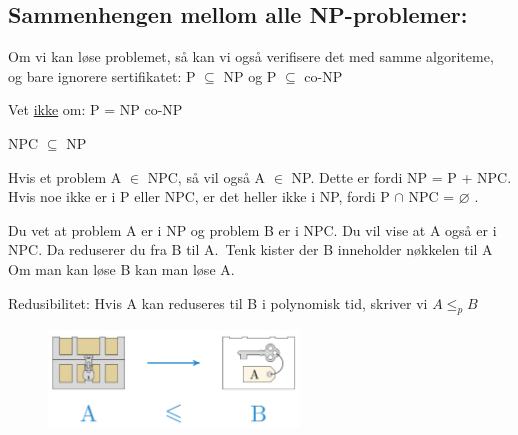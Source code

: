 \documentclass[12pt]{report}
\begin{document}

\setlength{\parskip}{10.56pt}



\newpage

\vspace{\baselineskip}\subsection*{Sammenhengen mellom alle NP-problemer:}
Om vi kan løse problemet, så kan vi også verifisere det med samme algoriteme, og bare ignorere sertifikatet: P $ \subseteq $  NP og P $ \subseteq $  co-NP\par

Vet \uline{ikke} om: P = NP  co-NP\par

NPC $ \subseteq $  NP\par

Hvis et problem A $ \in $  NPC, så vil også A $ \in $  NP. Dette er fordi NP = P + NPC. Hvis noe ikke er i P eller NPC, er det heller ikke i NP, fordi P $ \cap $  NPC = $ \varnothing $ .\par

\setlength{\parskip}{0.0pt}
Du vet at problem A er i NP og problem B er i NPC. Du vil vise at A også er i NPC. Da reduserer du fra B til A.\ Tenk kister der B inneholder nøkkelen til A   Om man kan løse B kan man løse A. \par

Redusibilitet: Hvis A kan reduseres til B i polynomisk tid, skriver vi  \( A  \leq _{p}B \) \par




\begin{figure}[H]
	\begin{Center}
		\includegraphics[width=2.62in,height=1.02in]{./media/image157.png}
	\end{Center}
\end{figure}
\end{document}
